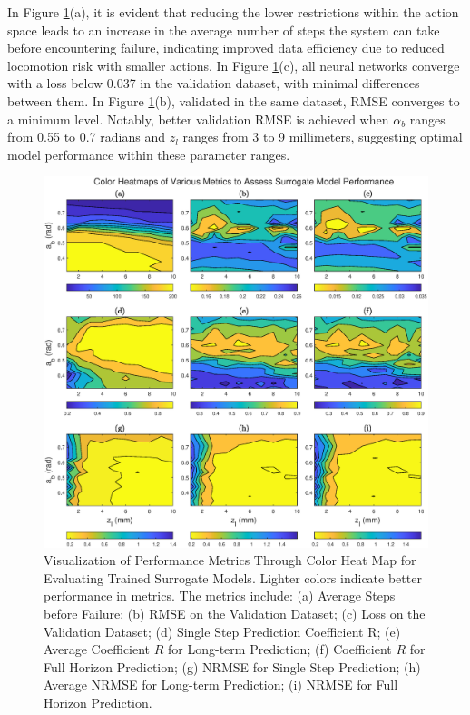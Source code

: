 In Figure \ref{fig:NN_heat}(a), it is evident that reducing the lower restrictions within the action space leads to an increase in the average number of steps the system can take before encountering failure, indicating improved data efficiency due to reduced locomotion risk with smaller actions. In Figure \ref{fig:NN_heat}(c), all neural networks converge with a loss below 0.037 in the validation dataset, with minimal differences between them. In Figure \ref{fig:NN_heat}(b), validated in the same dataset, RMSE converges to a minimum level. Notably, better validation RMSE is achieved when $\alpha_b$ ranges from 0.55 to 0.7 radians and $z_l$ ranges from 3 to 9 millimeters, suggesting optimal model performance within these parameter ranges.
\begin{figure}[htb]
    \centering
    \includegraphics[width=\linewidth]{img/chap5/NN_heat.eps}
    \caption{Visualization of Performance Metrics Through Color Heat Map for Evaluating Trained Surrogate Models. Lighter colors indicate better performance in metrics. The metrics include: (a) Average Steps before Failure; (b) \ac{RMSE} on the Validation Dataset; (c) Loss on the Validation Dataset; (d) Single Step Prediction Coefficient R; (e) Average Coefficient $R$ for Long-term Prediction; (f) Coefficient $R$ for Full Horizon Prediction; (g) NRMSE for Single Step Prediction; (h) Average NRMSE for Long-term Prediction; (i) NRMSE for Full Horizon Prediction.}
    \label{fig:NN_heat}
\end{figure}

